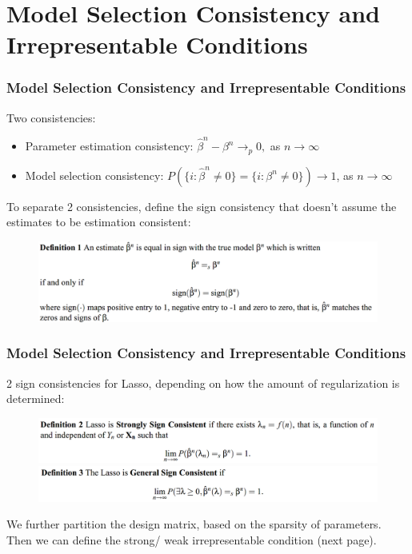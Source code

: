 \documentclass{beamer}
\begin{document}
	\section{Model Selection Consistency and Irrepresentable Conditions}
	
	\begin{frame}
		\frametitle{Model Selection Consistency and Irrepresentable Conditions}
		Two consistencies:
		\begin{itemize}
			\item 
			Parameter estimation consistency: $\hat{\beta}^n - \beta^n \to_p 0,$ as $n \to \infty$
			\item
			Model selection consistency: $P(\{i: \hat{\beta}^n \ne 0\} = \{i: \beta^n \ne 0\}) \to 1$, as $n \to \infty$
		\end{itemize}
		To separate 2 consistencies, define the sign consistency that doesn't assume the estimates to be estimation consistent:
		\begin{figure}
			\includegraphics[width=1\linewidth]{image001.png}
		\end{figure}
	\end{frame}
	
	\begin{frame}
		\frametitle{Model Selection Consistency and Irrepresentable Conditions}
		2 sign consistencies for Lasso, depending on how the amount of regularization is determined:
		\begin{figure}
			\includegraphics[width=1\linewidth]{image002.png}
			\includegraphics[width=1\linewidth]{image003.png}
		\end{figure}
		We further partition the design matrix, based on the sparsity of parameters. Then we can define the strong/ weak irrepresentable condition (next page).
		
	\end{frame}
	
\end{document}
